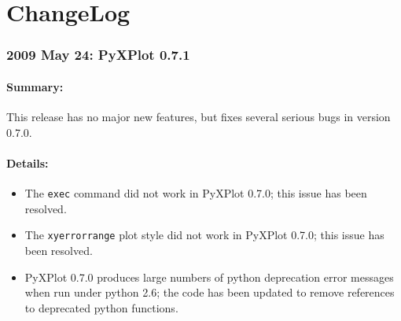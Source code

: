 %
%
%
%
%



\chapter{ChangeLog}

\subsection*{2009 May 24: PyXPlot 0.7.1}

\subsubsection*{Summary:}

This release has no major new features, but fixes several serious bugs in version 0.7.0.

\subsubsection*{Details:}

\begin{itemize}
\item The {\tt exec} command did not work in PyXPlot 0.7.0; this issue has been resolved.
\item The {\tt xyerrorrange} plot style did not work in PyXPlot 0.7.0; this issue has been resolved.
\item PyXPlot 0.7.0 produces large numbers of python deprecation error messages when run under python 2.6; the code has been updated to remove references to deprecated python functions.
\end{itemize}

